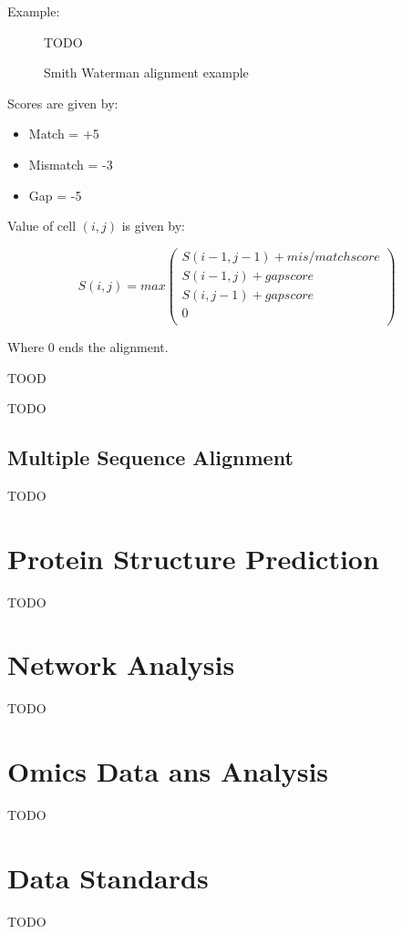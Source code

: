 \documentclass[a4paper]{article}
\begin{document}
Example:

\begin{figure}[h!]
  \centering
  TODO
  \caption{Smith Waterman alignment example}
  \label{fig:sw_alignment_eg}
\end{figure}
\FloatBarrier

Scores are given by:

\begin{itemize}
  \item Match = +5
  \item Mismatch = -3
  \item Gap = -5
\end{itemize}

Value of cell $(i, j)$ is given by:

\[
  S(i, j) = max
    \left (
    \begin{array}{ll}
      S(i-1, j-1) + mis/match score \\
      S(i-1, j) + gap score \\
      S(i, j-1) + gap score \\
      0 \\
    \end{array}
    \right )
\]

Where 0 ends the alignment.


TOOD


TODO

\subsection{Multiple Sequence Alignment}

TODO

\section{Protein Structure Prediction}

TODO

\section{Network Analysis}

TODO

\section{Omics Data ans Analysis}

TODO

\section{Data Standards}

TODO
\end{document}
